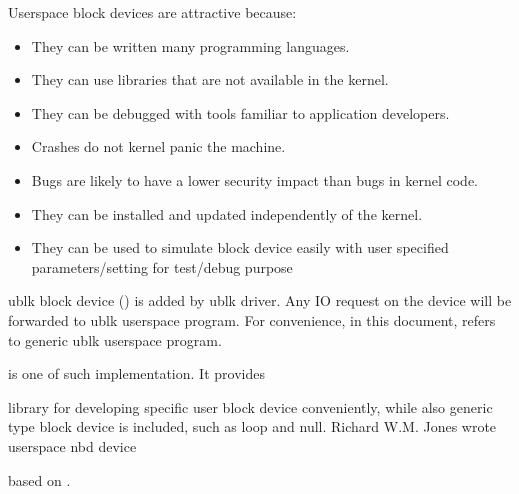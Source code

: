 \documentclass[a4paper,11pt,english]{sphinxmanual}
\begin{document}
Userspace block devices are attractive because:
\begin{itemize}
\item {} 
They can be written many programming languages.

\item {} 
They can use libraries that are not available in the kernel.

\item {} 
They can be debugged with tools familiar to application developers.

\item {} 
Crashes do not kernel panic the machine.

\item {} 
Bugs are likely to have a lower security impact than bugs in kernel
code.

\item {} 
They can be installed and updated independently of the kernel.

\item {} 
They can be used to simulate block device easily with user specified
parameters/setting for test/debug purpose

\end{itemize}

ublk block device () is added by ublk driver. Any IO request
on the device will be forwarded to ublk userspace program. For convenience,
in this document,  refers to generic ublk userspace
program.  %
\begin{footnote}[1]\sphinxAtStartFootnote
{}
%
\end{footnote} is one of such implementation. It
provides  %
\begin{footnote}[2]\sphinxAtStartFootnote
{}
%
\end{footnote} library for developing specific
user block device conveniently, while also generic type block device is
included, such as loop and null. Richard W.M. Jones wrote userspace nbd device
\begin{footnote}[3]\sphinxAtStartFootnote
{}
%
\end{footnote}  based on  \sphinxfootnotemark[2].
\end{document}
